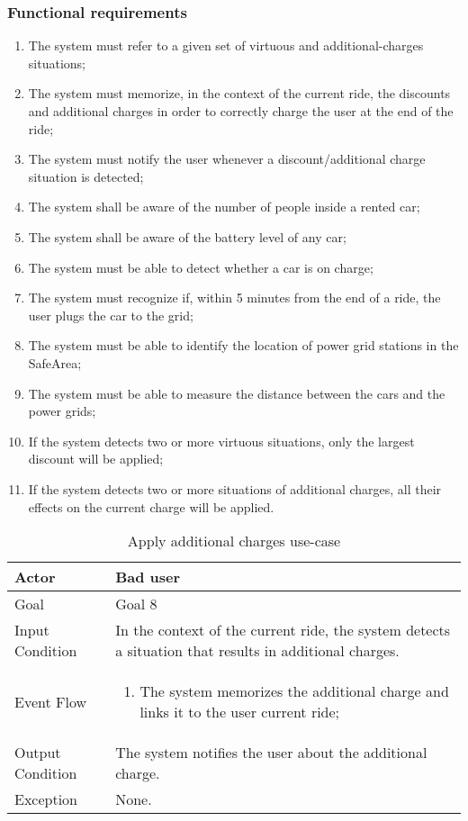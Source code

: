 \subsubsection{Functional requirements}
\begin{enumerate}
\item The system must refer to a given set of virtuous and additional-charges situations;
\item The system must memorize, in the context of the current ride, the discounts and additional charges in order to correctly charge the user at the end of the ride;
\item The system must notify the user whenever a discount/additional charge situation is detected;
\item The system shall be aware of the number of people inside a rented car;
\item The system shall be aware of the battery level of any car;
\item The system must be able to detect whether a car is on charge;
\item The system must recognize if, within 5 minutes from the end of a ride, the user plugs the car to the grid;
\item The system must be able to identify the location of power grid stations in the SafeArea;
\item The system must be able to measure the distance between the cars and the power grids;
\item If the system detects two or more virtuous situations, only the largest discount will be applied;
\item If the system detects two or more situations of additional charges, all their effects on the current charge will be applied.
\end{enumerate}

\begin{table}[H]
\begin{center}
\begin{tabular}{p{} | p{}}
\hline
Actor & Bad user\\
\hline
Goal & Goal 8\\
\hline
Input Condition & In the context of the current ride, the system detects a situation that results in additional charges.\\
\hline
Event Flow & 
\begin{enumerate}
\item The system memorizes the additional charge and links it to the user current ride;
\end{enumerate} \\
\hline
Output Condition & The system notifies the user about the additional charge.\\
\hline
Exception & None.\\
\hline
\end{tabular}
\end{center}
\caption{Apply additional charges use-case}
\label{apply_additional_charges_uc}
\end{table}

